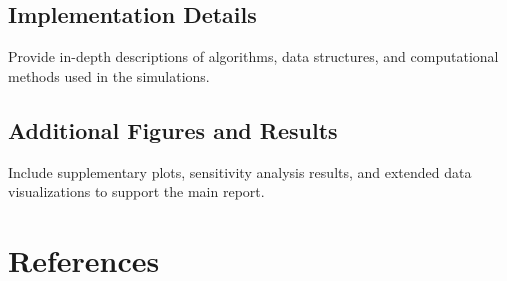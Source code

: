 \documentclass[12pt]{article}
\begin{document}
\subsection{Implementation Details}
Provide in-depth descriptions of algorithms, data structures, and computational methods used in the simulations.

\subsection{Additional Figures and Results}
Include supplementary plots, sensitivity analysis results, and extended data visualizations to support the main report.

\newpage
\section{References}
\end{document}
